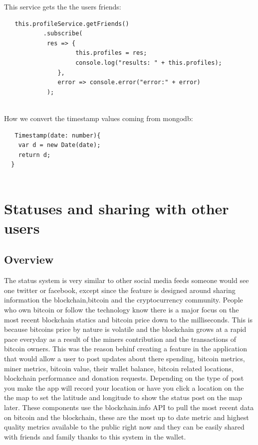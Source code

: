 This service gets the the users friends:
\begin{lstlisting}
   this.profileService.getFriends()
           .subscribe(
            res => {
                    this.profiles = res;
                    console.log("results: " + this.profiles);
               },
               error => console.error("error:" + error)
            );
  
\end{lstlisting}

How we convert the timestamp values coming from mongodb:
\begin{lstlisting}
   Timestamp(date: number){
    var d = new Date(date);
    return d;
  }
  
\end{lstlisting}

\section{Statuses and sharing with other users}

\subsection{Overview}
The status system is very similar to other social media feeds someone would see one twitter or facebook, except since the feature is designed around sharing information the blockchain,bitcoin and the cryptocurrency community. People who own bitcoin or follow the technology know there is a major focus on the most recent blockchain statics and bitcoin price down to the milliseconds. This is because bitcoins price by nature is volatile and the blockchain grows at a rapid pace everyday as a result of the miners contribution and the transactions of bitcoin owners. This was the reason behinf creating a feature in the application that would allow a user to post updates about there spending, bitcoin metrics, miner metrics, bitcoin value, their wallet balance, bitcoin related locations, blockchain performance and donation requests. Depending on the type of post you make the app will record your location or have you click a location on the the map to set the latitude and longitude to show the status post on the map later. These components use the blockchain.info API to pull the most recent data on bitcoin and the blockchain, these are the most up to date metric and highest quality metrics available to the public right now and they can be easily shared with friends and family thanks to this system in the wallet.

